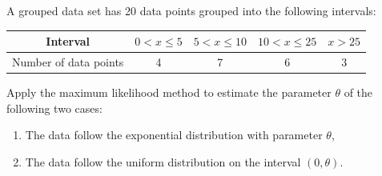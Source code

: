 \begin{example}
    A grouped data set has 20 data points grouped into the following intervals:
    \begin{table}[h!]
    \centering
    \begin{tabular}{|c|c|c|c|c|}
    \hline
    Interval & $0 < x \leq 5$ & $5 < x \leq 10$ & $10 < x \leq 25$ & $x > 25$ \\
    \hline
    Number of data points & 4 & 7 & 6 & 3 \\
    \hline
    \end{tabular}
    \end{table}
    
    Apply the maximum likelihood method to estimate the parameter $\theta$ of the following two cases:
    
    \begin{enumerate}
        \item The data follow the exponential distribution with parameter $\theta$,
        \item The data follow the uniform distribution on the interval $(0, \theta)$.
    \end{enumerate}
\end{example}

